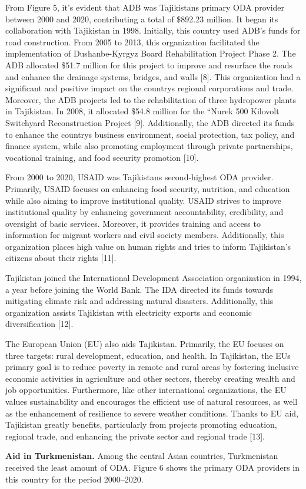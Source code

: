 \begin{multicols}{2}
From Figure 5, it's evident that ADB was Tajikistan\textquotesingle s
primary ODA provider between 2000 and 2020, contributing a total of
\$892.23 million. It began its collaboration with Tajikistan in 1998.
Initially, this country used ADB's funds for road construction. From
2005 to 2013, this organization facilitated the implementation of
Dushanbe-Kyrgyz Board Rehabilitation Project Phase 2. The ADB allocated
\$51.7 million for this project to improve and resurface the roads and
enhance the drainage systems, bridges, and walls {[}8{]}. This
organization had a significant and positive impact on the
country\textquotesingle s regional corporations and trade. Moreover, the
ADB projects led to the rehabilitation of three hydropower plants in
Tajikistan. In 2008, it allocated \$54.8 million for the ``Nurek 500
Kilovolt Switchyard Reconstruction Project {[}9{]}. Additionally, the
ADB directed its funds to enhance the country\textquotesingle s business
environment, social protection, tax policy, and finance system, while
also promoting employment through private partnerships, vocational
training, and food security promotion {[}10{]}.

From 2000 to 2020, USAID was Tajikistan\textquotesingle s second-highest
ODA provider. Primarily, USAID focuses on enhancing food security,
nutrition, and education while also aiming to improve institutional
quality. USAID strives to improve institutional quality by enhancing
government accountability, credibility, and oversight of basic services.
Moreover, it provides training and access to information for migrant
workers and civil society members. Additionally, this organization
places high value on human rights and tries to inform Tajikistan's
citizens about their rights {[}11{]}.

Tajikistan joined the International Development Association organization
in 1994, a year before joining the World Bank. The IDA directed its
funds towards mitigating climate risk and addressing natural disasters.
Additionally, this organization assists Tajikistan with electricity
exports and economic diversification {[}12{]}.

The European Union (EU) also aids Tajikistan. Primarily, the EU focuses
on three targets: rural development, education, and health. In
Tajikistan, the EU\textquotesingle s primary goal is to reduce poverty
in remote and rural areas by fostering inclusive economic activities in
agriculture and other sectors, thereby creating wealth and job
opportunities. Furthermore, like other international organizations, the
EU values sustainability and encourages the efficient use of natural
resources, as well as the enhancement of resilience to severe weather
conditions. Thanks to EU aid, Tajikistan greatly benefits, particularly
from projects promoting education, regional trade, and enhancing the
private sector and regional trade {[}13{]}.

{\bfseries Aid in Turkmenistan.} Among the central Asian countries,
Turkmenistan received the least amount of ODA. Figure 6 shows the
primary ODA providers in this country for the period 2000--2020.
\end{multicols}

